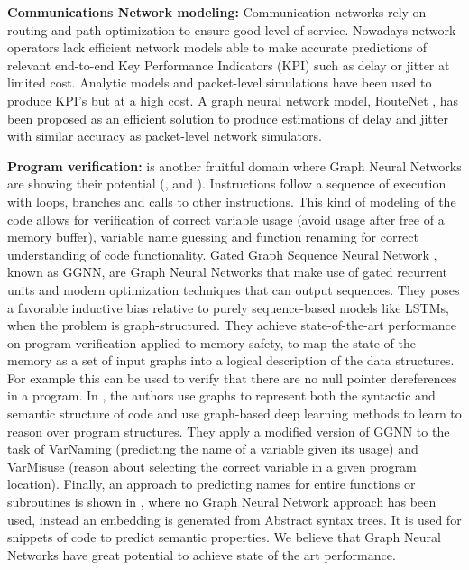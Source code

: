 \textbf{Communications Network modeling:} Communication networks rely on routing and path optimization to ensure good level of service. Nowadays network operators lack efficient network models able to make accurate predictions of relevant end-to-end Key Performance Indicators (KPI) such as delay or jitter at limited cost. Analytic models and packet-level simulations have been used to produce KPI's but at a high cost. A graph neural network model, RouteNet \cite{rusek2019unveiling}, has been proposed as an efficient solution to produce estimations of delay and jitter with similar accuracy as packet-level network simulators.


\textbf{Program verification:} is another fruitful domain where Graph Neural Networks are showing their potential (\cite{ggnn}, \cite{139} and \cite{code2vec}). Instructions follow a sequence of execution with loops, branches and calls to other instructions. This kind of modeling of the code allows for verification of correct variable usage (avoid usage after free of a memory buffer), variable name guessing and function renaming for correct understanding of code functionality. Gated Graph Sequence Neural Network \cite{ggnn}, known as GGNN, are Graph Neural Networks that make use of gated recurrent units and modern optimization techniques that can output sequences. They poses a favorable inductive bias relative to purely sequence-based models like LSTMs, when the problem is graph-structured. They achieve state-of-the-art performance on program verification applied to memory safety, to map the state of the memory as a set of input graphs into a logical description of the data structures. For example this can be used to verify that there are no null pointer dereferences in a program. In \cite{139}, the authors use graphs to represent both the syntactic and semantic structure of code and use graph-based deep learning methods to learn to reason over program structures. They apply a modified version of GGNN to the task of VarNaming (predicting the name of a variable given its usage) and VarMisuse (reason about selecting the correct variable in a given program location). Finally, an approach to predicting names for entire functions or subroutines is shown in \cite{code2vec}, where no Graph Neural Network approach has been used, instead an embedding is generated from Abstract syntax trees. It is used for snippets of code to predict semantic properties. We believe that Graph Neural Networks have great potential to achieve state of the art performance.


